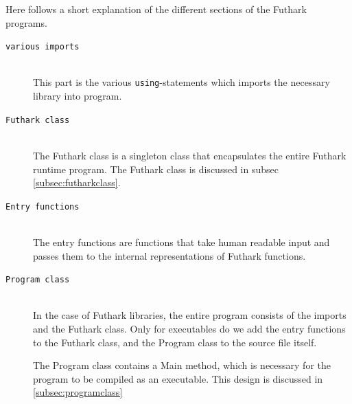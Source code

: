 Here follows a short explanation of the different sections of the Futhark
programs.
\begin{description}
\item[\texttt{various imports}] \hfill \\
  This part is the various \texttt{using}-statements which imports the necessary
  library into \csharp{} program.
  
\item[\texttt{Futhark class}] \hfill \\
  The Futhark class is a singleton class that encapsulates the entire Futhark
  runtime program. The Futhark class is discussed in subsec \ref{subsec:futharkclass}.
  
\item[\texttt{Entry functions}] \hfill \\
  The entry functions are functions that take human readable input and passes
  them to the internal representations of Futhark functions.
\item[\texttt{Program class}] \hfill \\
  In the case of Futhark libraries, the entire \csharp{} program consists
  of the imports and the Futhark class. Only for executables do we add the entry
  functions to the Futhark class, and the Program class to the \csharp{} source
  file itself.
 
  The Program class contains a Main method, which is necessary for the \csharp{}
  program to be compiled as an executable. This design is discussed in \ref{subsec:programclass}
\end{description}

